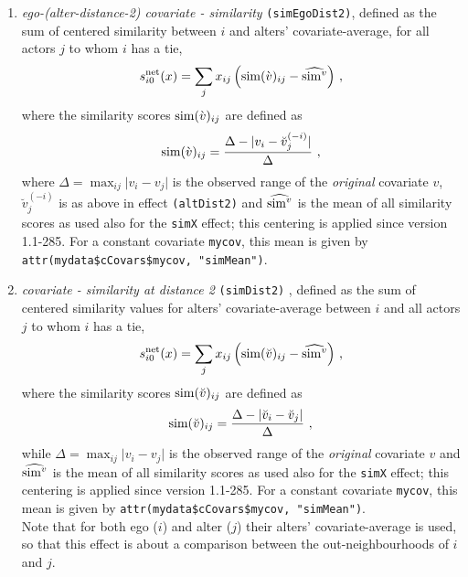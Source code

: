 \documentclass[a4paper,fleqn,11pt]{article}
\newcommand{\+}{\, + \,}
\newcommand{\vit}{\theenumi}
\begin{document}
\begin{enumerate}
\item \emph{ego-(alter-distance-2) covariate - similarity} \texttt{(simEgoDist2)},
      defined as the sum of centered similarity  between $i$
      and alters' covariate-average, for all actors
      $j$ to whom $i$ has a tie,
\[
 s^{\rm net}_{i\vit}(x) = \sum_j x_{ij}\, \Big({\rm sim}(\grave v)_{ij}
  - \widehat{{\rm sim}^v}\Big) \ ,
\]
 where the similarity scores ${\rm sim}(\grave v)_{ij}$ are defined as
\[
{\rm sim}(\grave v)_{ij}=
 \frac{\Delta-\vert  v_i - \breve v_j^{(-i)} \vert}{\Delta} \ ,
\]
  where
 $\Delta=\max_{ij}\vert v_i - v_j \vert$ is the observed range of the
 \emph{original} covariate $v$,
 $\breve v_j^{(-i)}$ is as above in effect \texttt{(altDist2)}
 and $\widehat{{\rm sim}^v}$ is the mean of all similarity scores as used also
 for the \texttt{simX} effect; this centering is applied since version 1.1-285.
 For a constant covariate \texttt{mycov}, this mean is given by
 \texttt{attr(mydata\$cCovars\$mycov, "simMean")}.

\item \emph{covariate - similarity at distance 2} \texttt{(simDist2)} ,
      defined as the sum of centered similarity
      values for alters' covariate-average between $i$ and all actors
      $j$ to whom $i$ has a tie,
\[
 s^{\rm net}_{i\vit}(x) = \sum_j x_{ij} \,\Big({\rm sim}(\breve v)_{ij}
  - \widehat{{\rm sim}^v}\Big) \ ,
\]
 where the similarity scores ${\rm sim}(\breve v)_{ij}$ are defined as
\[
{\rm sim}(\breve v)_{ij}=
 \frac{\Delta-\vert \breve v_i - \breve v_j \vert}{\Delta} \ ,
\]
 while
 $\Delta=\max_{ij}\vert v_i - v_j \vert$ is the observed range of the
 \emph{original} covariate $v$
 and $\widehat{{\rm sim}^v}$ is the mean of all similarity scores as used also
 for the \texttt{simX} effect; this centering is applied since version 1.1-285.
 For a constant covariate \texttt{mycov}, this mean is given by
 \texttt{attr(mydata\$cCovars\$mycov, "simMean")}.\\

  Note that for both ego ($i$) and alter ($j$) their alters' covariate-average
  is used, so that this effect is about a comparison between the
  out-neighbourhoods of $i$ and $j$.


\end{enumerate}
\end{document}
